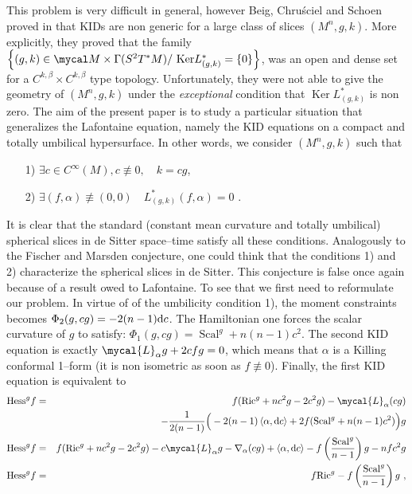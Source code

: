 \documentclass[a4paper,11pt,leqno]{amsart}
\numberwithin{equation}{section}
\theoremstyle{main}
\begin{document}
This problem is very difficult in general, however Beig, Chru\'sciel and Schoen proved in \cite{BChS} that KIDs are non generic for a large class of slices $(M^n,g,k)$. More explicitly, they proved that the family $  \left\{(g,k)\in \mycal M \times \Gamma(S^2 T^*M)/ \  {\operatorname{Ker}} L^*_{(g,k)}=\left\{0\right\}\right\}$, was an open and dense set for a $C^{k,\beta}\times C^{k,\beta}$ type topology. Unfortunately, they were not able to give the geometry of $(M^n,g,k)$ under the \textit{exceptional} condition that ${\operatorname{Ker}} L^*_{(g,k)}$ is non zero. The aim of the present paper is to study a particular situation that generalizes the Lafontaine equation, namely the KID equations on a compact and totally umbilical hypersurface. In other words, we consider $(M^n,g,k)$ such that
\begin{itemize}
\item[1)]$ \exists c \in C^{\infty}(M), c\not\equiv 0,  \quad k=cg $, 
\item[2)] $ \exists (f,\alpha)\not\equiv (0,0)  \quad L^*_{(g,k)}(f,\alpha)=0 $ .
\end{itemize}
It is clear that the standard (constant mean curvature and totally umbilical) spherical slices in de Sitter space--time satisfy all these conditions. Analogously to the Fischer and Marsden conjecture, one could think that the conditions 1) and 2) characterize the spherical slices in de Sitter. This conjecture is false once again because of a result owed to Lafontaine. To see that we first need to reformulate our problem. In virtue of of the umbilicity condition 1), the moment constraints becomes $\Phi_2 (g, cg)= -2(n-1){{\rm d}} c$. The Hamiltonian one forces the scalar curvature of $g$ to satisfy: $ \Phi_1(g,cg) ={\operatorname{Scal}}^g + n(n-1)c^2 $. The second KID equation is exactly  $\mycal{L}_\alpha g + 2cfg= 0 $, which means that $\alpha$ is a Killing conformal 1--form (it is non isometric as soon as $f\not \equiv 0$). Finally, the first KID equation is equivalent to 
\begin{eqnarray*}
	{\operatorname{Hess}}^g f &=& f({\operatorname{Ric}}^g +nc^2 g -2 c^2 g ) - \mycal{L}_\alpha (cg) \\
	 && - \frac{1}{2(n-1)}\Big(  -2(n-1)\left\langle \alpha, {{\rm d}} c\right\rangle + 2f ({\operatorname{Scal}}^g + n(n-1)c^2)  \Big)g \\
	{\operatorname{Hess}}^g f &=& f({\operatorname{Ric}}^g +nc^2 g -2 c^2 g ) -  c\mycal{L}_\alpha g - \nabla_{\alpha}(cg) + \left\langle \alpha, {{\rm d}} c\right\rangle - f\left(\frac{{\operatorname{Scal}}^g}{n-1}\right)g -nfc^2 g  \\
	{\operatorname{Hess}}^g f &=& f {\operatorname{Ric}}^g - f\left(\frac{{\operatorname{Scal}}^g}{n-1}\right)g \  ,
\end{eqnarray*}
\end{document}
